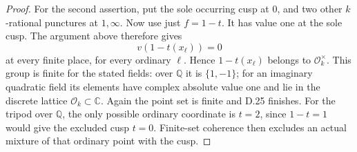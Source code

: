 \begin{proof}
For the second assertion, put the sole
occurring cusp at \(0\), and two other
\(k\)-rational punctures at \(1,\infty\).
Now use just \(f=1-t\). It has value
one at the sole cusp. The argument
above therefore gives
\[
                   v(1-t(x_\ell))=0
\]
at every finite place, for every ordinary
\(\ell\). Hence \(1-t(x_\ell)\) belongs
to \(\mathcal O_k^\times\). This group
is finite for the stated fields: over
\(\mathbb Q\) it is \(\{1,-1\}\);
for an imaginary quadratic field its
elements have complex absolute value
one and lie in the discrete lattice
\(\mathcal O_k\subset\mathbb C\).
Again the point set is finite and D.25
finishes. For the tripod over
\(\mathbb Q\), the only possible
ordinary coordinate is \(t=2\), since
\(1-t=1\) would give the excluded
cusp \(t=0\). Finite-set coherence
then excludes an actual mixture of
that ordinary point with the cusp.
\end{proof}

